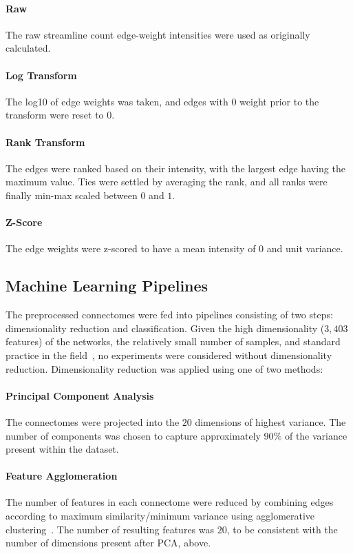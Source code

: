 \documentclass[10pt]{SelfArx} %
\newcommand{\new}[1]{\color{blue}#1\color{black}\xspace}
\begin{document}
\paragraph{Raw} The raw streamline count edge-weight intensities were used as originally calculated.

\paragraph{Log Transform} The log10 of edge weights was taken, and edges with $0$ weight prior to the transform were
reset to $0$.

\paragraph{Rank Transform} The edges were ranked based on their intensity, with the largest edge having the maximum
value. Ties were settled by averaging the rank, and all ranks were finally min-max scaled between $0$ and $1$.

\paragraph{Z-Score} The edge weights were z-scored to have a mean intensity of $0$ and unit variance.

\subsection*{Machine Learning Pipelines}

The preprocessed connectomes were fed into pipelines consisting of two steps: dimensionality reduction and
classification. \new{Given the high dimensionality ($3,403$ features) of the networks, the relatively small number of
samples, and standard practice in the field~\cite{Payabvash2019-tm,Park2015-uj,weis2020sex}, no experiments were
considered without dimensionality reduction.} Dimensionality reduction was applied using one of two methods:

\paragraph{Principal Component Analysis} The connectomes were projected into the $20$ dimensions of highest variance.
The number of components was chosen to capture approximately $90\%$ of the variance present within the dataset.

\paragraph{Feature Agglomeration} The number of features in each connectome were reduced by combining edges according
to maximum similarity/minimum variance using agglomerative clustering~\cite{Ward1963-uh}. The number of resulting
features was $20$, to be consistent with the number of dimensions present after PCA, above.
\end{document}
